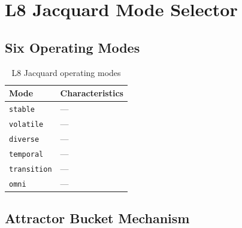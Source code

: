
\chapter{L8 Jacquard Mode Selector}
\label{vol2:chap:jacquard}


\section{Six Operating Modes}
\label{vol2:sec:jacquard:modes}


\begin{table}[ht]
  \centering
  \caption{L8 Jacquard operating modes}
  \label{tab:jacquard-modes}
  \begin{tabular}{ll}
    \toprule
    Mode & Characteristics \\
    \midrule
    \texttt{stable}     & --- \\
    \texttt{volatile}   & --- \\
    \texttt{diverse}    & --- \\
    \texttt{temporal}   & --- \\
    \texttt{transition} & --- \\
    \texttt{omni}       & --- \\
    \bottomrule
  \end{tabular}
\end{table}

\section{Attractor Bucket Mechanism}
\label{vol2:sec:jacquard:attractors}

